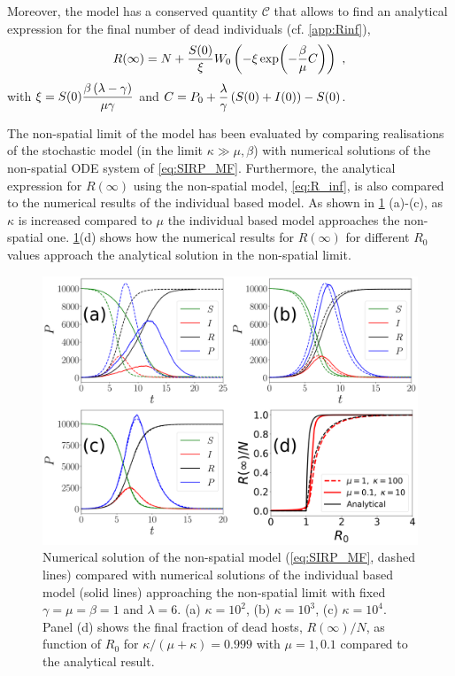 Moreover, the model has a conserved quantity $\mathcal{C}$
\cite{GimenezRomero2021} that allows to find an analytical expression for the
final number of dead individuals (cf. \cref{app:Rinf}),
\begin{equation}\label{eq:R_inf}
    R(\infty)=N+\frac{S(0)}{\xi}W_0\left(-\xi\exp(-\frac{\beta}{\mu}C)\right) \
    ,
\end{equation}
with $\displaystyle\xi=S(0)\frac{\beta\left(\lambda-\gamma\right)}{\mu\gamma}$
and $\displaystyle C=P_0+\frac{\lambda}{\gamma}\left(S(0)+I(0)\right)-S(0)$.

The non-spatial limit of the model has been evaluated by comparing realisations
of the stochastic model (in the limit $\kappa\gg\mu,\beta$) with numerical
solutions of the non-spatial ODE system of \cref{eq:SIRP_MF}. Furthermore, the
analytical expression for $R(\infty)$ using the non-spatial model,
\cref{eq:R_inf}, is also compared to the numerical results of the individual
based model. As shown in \cref{fig:MF_limit} (a)-(c), as $\kappa$ is increased
compared to $\mu$ the individual based model approaches the non-spatial one.
\cref{fig:MF_limit}(d) shows how the numerical results for $R(\infty)$ for
different $R_0$ values approach the analytical solution in the non-spatial
limit.

\begin{figure}[H]
    \centering
    \includegraphics[width=\columnwidth]{Figures/MF_comparison.png}
    \caption{Numerical solution of the non-spatial model (\cref{eq:SIRP_MF},
        dashed lines) compared with numerical solutions of the individual based
        model
        (solid lines) approaching the non-spatial limit with fixed
        $\gamma=\mu=\beta=1$
        and $\lambda=6$. (a) $\kappa=10^2$, (b) $\kappa=10^3$, (c)
        $\kappa=10^4$. Panel
        (d) shows the final fraction of dead hosts, $R(\infty)/N$, as function
        of $R_0$
        for $\kappa/(\mu+\kappa)=0.999$ with $\mu=1,0.1$ compared to the
        analytical
        result.}
    \label{fig:MF_limit}
\end{figure}

